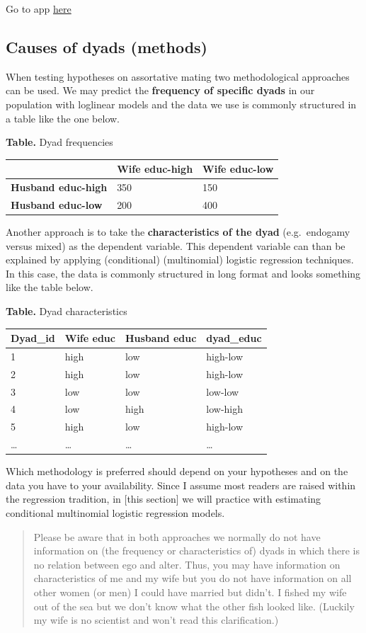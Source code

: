 \documentclass[
]{book}
\begin{document}
Go to app \href{https://jtolsma.shinyapps.io/marriagemarket/}{here}

\hypertarget{causes-of-dyads-methods}{%
\subsection{Causes of dyads (methods)}\label{causes-of-dyads-methods}}

When testing hypotheses on assortative mating two methodological approaches can be used. We may predict the \textbf{frequency of specific dyads} in our population with loglinear models and the data we use is commonly structured in a table like the one below.

\textbf{Table.} Dyad frequencies

\begin{longtable}[]{@{}lll@{}}
\toprule
& Wife educ-high & Wife educ-low\tabularnewline
\midrule
\endhead
\textbf{Husband educ-high} & 350 & 150\tabularnewline
\textbf{Husband educ-low} & 200 & 400\tabularnewline
\bottomrule
\end{longtable}

Another approach is to take the \textbf{characteristics of the dyad} (e.g.~endogamy versus mixed) as the dependent variable. This dependent variable can than be explained by applying (conditional) (multinomial) logistic regression techniques. In this case, the data is commonly structured in long format and looks something like the table below.

\textbf{Table.} Dyad characteristics

\begin{longtable}[]{@{}llll@{}}
\toprule
Dyad\_id & Wife educ & Husband educ & dyad\_educ\tabularnewline
\midrule
\endhead
1 & high & low & high-low\tabularnewline
2 & high & low & high-low\tabularnewline
3 & low & low & low-low\tabularnewline
4 & low & high & low-high\tabularnewline
5 & high & low & high-low\tabularnewline
\ldots{} & \ldots{} & \ldots{} & \ldots{}\tabularnewline
\bottomrule
\end{longtable}

Which methodology is preferred should depend on your hypotheses and on the data you have to your availability. Since I assume most readers are raised within the regression tradition, in {[}this section{]} we will practice with estimating conditional multinomial logistic regression models.

\begin{quote}
Please be aware that in both approaches we normally do not have information on (the frequency or characteristics of) dyads in which there is no relation between ego and alter. Thus, you may have information on characteristics of me and my wife but you do not have information on all other women (or men) I could have married but didn't. I fished my wife out of the sea but we don't know what the other fish looked like. (Luckily my wife is no scientist and won't read this clarification.)
\end{quote}
\end{document}
